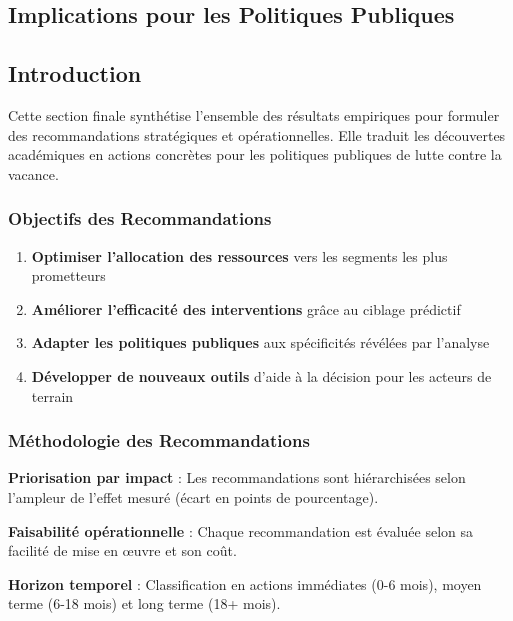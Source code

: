 \documentclass[11pt]{article}
\providecommand{\tightlist}{%
      \setlength{\itemsep}{0pt}\setlength{\parskip}{0pt}}
\begin{document}
\subsection{Implications pour les Politiques
Publiques}\label{implications-pour-les-politiques-publiques}

\subsection{Introduction}\label{introduction}

Cette section finale synthétise l'ensemble des résultats empiriques pour
formuler des recommandations stratégiques et opérationnelles. Elle
traduit les découvertes académiques en actions concrètes pour les
politiques publiques de lutte contre la vacance.

\subsubsection{Objectifs des
Recommandations}\label{objectifs-des-recommandations}

\begin{enumerate}
\def\labelenumi{\arabic{enumi}.}
\tightlist
\item
  \textbf{Optimiser l'allocation des ressources} vers les segments les
  plus prometteurs
\item
  \textbf{Améliorer l'efficacité des interventions} grâce au ciblage
  prédictif\\
\item
  \textbf{Adapter les politiques publiques} aux spécificités révélées
  par l'analyse
\item
  \textbf{Développer de nouveaux outils} d'aide à la décision pour les
  acteurs de terrain
\end{enumerate}

\subsubsection{Méthodologie des
Recommandations}\label{muxe9thodologie-des-recommandations}

\textbf{Priorisation par impact} : Les recommandations sont
hiérarchisées selon l'ampleur de l'effet mesuré (écart en points de
pourcentage).

\textbf{Faisabilité opérationnelle} : Chaque recommandation est évaluée
selon sa facilité de mise en œuvre et son coût.

\textbf{Horizon temporel} : Classification en actions immédiates (0-6
mois), moyen terme (6-18 mois) et long terme (18+ mois).
\end{document}
